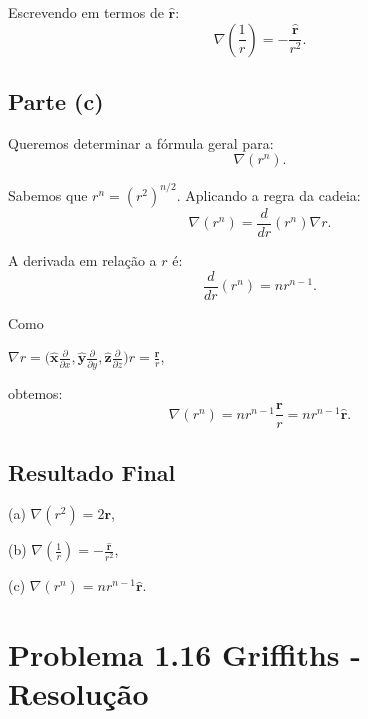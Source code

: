 \documentclass[a4paper,12pt]{article}
\begin{document}
Escrevendo em termos de \(\hat{\mathbf{r}}\):
\begin{equation}
\nabla \left(\frac{1}{r}\right) = -\frac{\hat{\mathbf{r}}}{r^2}.
\end{equation}

\subsection*{Parte (c)}

Queremos determinar a fórmula geral para:
\begin{equation}
\nabla (r^n).
\end{equation}

Sabemos que \(r^n = (r^2)^{n/2}\). Aplicando a regra da cadeia:
\begin{equation}
\nabla (r^n) = \frac{d}{dr}(r^n) \nabla r.
\end{equation}

A derivada em relação a \(r\) é:
\begin{equation}
\frac{d}{dr}(r^n) = n r^{n-1}.
\end{equation}

Como 

\(\nabla r = \Big(\hat{\mathbf{x}}\frac{\partial}{\partial x}, \hat{\mathbf{y}}\frac{\partial}{\partial y}, \hat{\mathbf{z}}\frac{\partial }{\partial z} \Big) r  = \frac{\mathbf{r}}{r}\), 


obtemos:
\begin{equation}
\nabla (r^n) = n r^{n-1} \frac{\mathbf{r}}{r} = n r^{n-1} \hat{\mathbf{r}}.
\end{equation}

\subsection*{Resultado Final}

(a) \(\nabla (r^2) = 2\mathbf{r}\),

(b) \(\nabla \left(\frac{1}{r}\right) = -\frac{\hat{\mathbf{r}}}{r^2}\),

(c) \(\nabla (r^n) = n r^{n-1} \hat{\mathbf{r}}\).


\section*{Problema 1.16 Griffiths - Resolu\c{c}\~ao}
\end{document}
